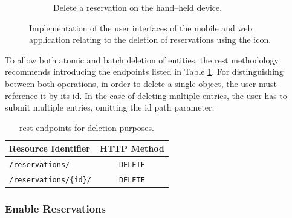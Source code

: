 \begin{figure}[h]
\begin{subfigure}[c]{0.3\textwidth}
         \caption{Delete a reservation on the hand--held device.}
         \label{fig:mobile-delete-reservation-impl}
    \end{subfigure}
    \caption{Implementation of the user interfaces of the mobile and web application relating to the deletion of reservations using the  icon.}
    \label{fig:impl-delete-reservation}
\end{figure}

\noindent To allow both atomic and batch deletion of entities, the \acrshort{rest} methodology recommends introducing the endpoints listed in Table \ref{tab:delete-reservation-rest}. 
For distinguishing between both operations, in order to delete a single object, the user must reference it by its \acrshort{id}. 
In the case of deleting multiple entries, the user has to submit multiple entries, omitting the \acrshort{id} path parameter.

\begingroup
\setlength{\tabcolsep}{10pt} %
\renewcommand{\arraystretch}{1.5} %
\begin{table}[h]
\centering
\caption{\acrshort{rest} endpoints for deletion purposes.}
    \begin{tabular}{l|c}
    Resource Identifier & HTTP Method \\ \hline
    \texttt{/reservations/} & \texttt{DELETE} \\
    \texttt{/reservations/\{id\}/} & \texttt{DELETE}
    \end{tabular}
\label{tab:delete-reservation-rest}
\end{table}
\endgroup

\newpage

\subsubsection{Enable Reservations}
\label{ch:Implementation:sec:Reservation System:ssec:Management Capabilities:sssec:Enable Reservations}

